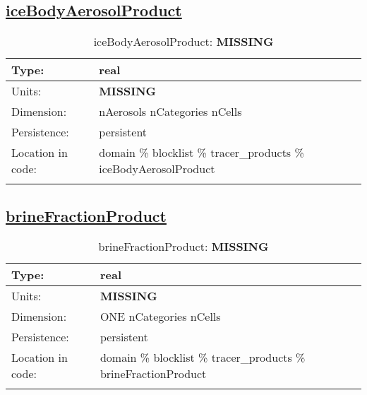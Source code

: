 \subsection[iceBodyAerosolProduct]{\hyperref[sec:var_tab_tracer_products]{iceBodyAerosolProduct}}
\label{subsec:var_sec_tracer_products_iceBodyAerosolProduct}
\begin{center}
\begin{longtable}{| p{2.0in} | p{4.0in} |}
        \hline 
        Type: & real \\
        \hline 
        Units: & {\bf \color{red} MISSING} \\
        \hline 
        Dimension: & nAerosols nCategories nCells \\
        \hline 
        Persistence: & persistent \\
        \hline 
         Location in code: & domain \% blocklist \% tracer\_products \% iceBodyAerosolProduct \\
         \hline 
    \caption{iceBodyAerosolProduct: {\bf \color{red} MISSING}}
\end{longtable}
\end{center}
\subsection[brineFractionProduct]{\hyperref[sec:var_tab_tracer_products]{brineFractionProduct}}
\label{subsec:var_sec_tracer_products_brineFractionProduct}
\begin{center}
\begin{longtable}{| p{2.0in} | p{4.0in} |}
        \hline 
        Type: & real \\
        \hline 
        Units: & {\bf \color{red} MISSING} \\
        \hline 
        Dimension: & ONE nCategories nCells \\
        \hline 
        Persistence: & persistent \\
        \hline 
         Location in code: & domain \% blocklist \% tracer\_products \% brineFractionProduct \\
         \hline 
    \caption{brineFractionProduct: {\bf \color{red} MISSING}}
\end{longtable}
\end{center}
